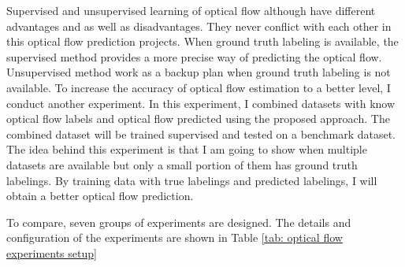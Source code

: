 \documentclass{iitthesis}
\begin{document}
Supervised and unsupervised learning of optical flow although have different advantages and as well as disadvantages. They never conflict with each other in this optical flow prediction projects. When ground truth labeling is available, the supervised method provides a more precise way of predicting the optical flow. Unsupervised method work as a backup plan when ground truth labeling is not available. To increase the accuracy of optical flow estimation to a better level, I conduct another experiment. In this experiment, I combined datasets with know optical flow labels and optical flow predicted using the proposed approach. The combined dataset will be trained supervised and tested on a benchmark dataset.　The idea behind this experiment is that I am going to show when multiple datasets are available but only a small portion of them has ground truth labelings. By training data with true labelings and predicted labelings, I will obtain a better optical flow prediction.

To compare, seven groups of experiments are designed. The details and configuration of the experiments are shown in Table \ref{tab: optical flow experiments setup}
\end{document}
